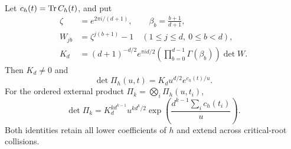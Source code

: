 \begin{theorem}
Let $c_h(t)=\operatorname{Tr} C_h(t)$, and put
\begin{align}
 \zeta&=e^{2\pi i/(d+1)},\qquad \beta_b=\frac{b+1}{d+1},
       \nonumber\\
 W_{jb}&=\zeta^{j(b+1)}-1
       \quad(1\le j\le d,\ 0\le b<d),\nonumber\\
 K_d&=(d+1)^{-d/2}e^{\pi i d/2}
           \left(\prod_{b=0}^{d-1}\Gamma(\beta_b)\right)\det W.
       \label{BC:eq:constant}
\end{align}
Then $K_d\ne0$ and
\begin{equation}
 \boxed{\det\Pi_h(u,t)=K_d u^{d/2}e^{c_h(t)/u}.}
 \label{BC:eq:det-one}
\end{equation}
For the ordered external product $\Pi_k=\bigotimes_i\Pi_h(u,t_i)$,
\begin{equation}
 \boxed{\det\Pi_k
   =K_d^{k d^{k-1}}u^{k d^k/2}
         \exp\!\left(\frac{d^{k-1}\sum_i c_h(t_i)}u\right).}
 \label{BC:eq:det-all}
\end{equation}
Both identities retain all lower coefficients of $h$ and extend across
critical-root collisions.
\end{theorem}
